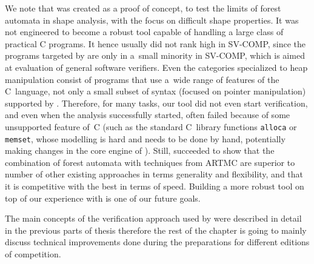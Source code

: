 {We note that \forester was created as a proof of concept, to test the limits of forest automata in shape analysis,
with the focus on difficult shape properties. 
It was not engineered to become a robust tool capable of handling a large class of practical C programs. 
%
It hence usually did not rank high in SV-COMP, since the programs
targeted by \forester are only in a~small minority in SV-COMP, which is aimed at
evaluation of general software verifiers.
Even the categories specialized to heap manipulation consist of programs that
use a~wide range of features of the C~language, not only a small subset of syntax
(focused on pointer manipulation) supported by \forester{}.
Therefore, for many tasks, our tool did not even start verification, and even
when the analysis successfully started, \forester{} often failed because
of some unsupported feature of~C (such as the standard C~library functions
\texttt{alloca} or \texttt{memset}, whose modelling is hard and needs to be done by
hand, potentially making changes in the core engine of \forester).
%
Still, \forester succeeded to show that the combination of forest automata with techniques from ARTMC are superior to number of other existing approaches in terms generality and flexibility, and that it is competitive with the best in terms of speed.
%
Building a more robust tool on top of our experience with \forester is one of our future goals.

The main concepts of the verification approach used by \forester were described in detail in the previous parts of thesis
therefore the rest of the chapter is going to mainly discuss technical improvements done during the preparations for different editions of competition.


}
